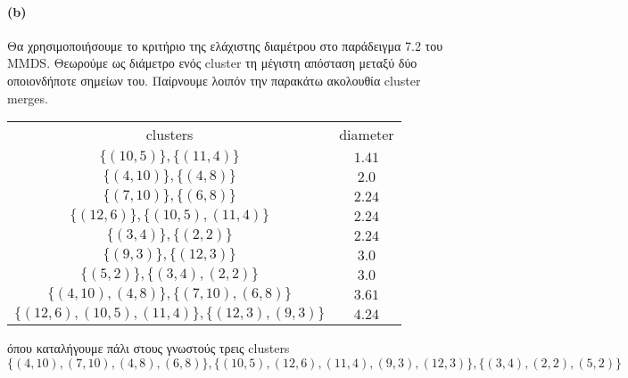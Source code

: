 \documentclass[a4paper,11pt]{article}
\begin{document}
\paragraph{(b)} Θα χρησιμοποιήσουμε το κριτήριο της ελάχιστης διαμέτρου στο παράδειγμα 7.2 του MMDS.
Θεωρούμε ως διάμετρο ενός cluster τη μέγιστη απόσταση μεταξύ δύο οποιονδήποτε σημείων του.
Παίρνουμε λοιπόν την παρακάτω ακολουθία cluster merges.
\begin{center}
	\begin{tabular}{| c | c |}
		\hline
		clusters & diameter \\ \hhline{|=|=|}
		$\{(10, 5)\},\{(11, 4)\}$ & $1.41$ \\ \hline
		$\{(4, 10)\},\{(4, 8)\}$ & $2.0$ \\ \hline
		$\{(7, 10)\},\{(6, 8)\}$ & $2.24$ \\ \hline
		$\{(12, 6)\},\{(10, 5), (11, 4)\}$ & $2.24$ \\ \hline
		$\{(3, 4)\},\{(2, 2)\}$ & $2.24$ \\ \hline
		$\{(9, 3)\},\{(12, 3)\}$ & $3.0$ \\ \hline
		$\{(5, 2)\},\{(3, 4), (2, 2)\}$ & $3.0$ \\ \hline
		$\{(4, 10), (4, 8)\},\{(7, 10), (6, 8)\}$ & $3.61$ \\ \hline
		$\{(12, 6), (10, 5), (11, 4)\},\{(12, 3), (9, 3)\}$ & $4.24$ \\ \hline
	\end{tabular}
\end{center}
όπου καταλήγουμε πάλι στους γνωστούς τρεις clusters
\[ \{ (4,10),(7,10),(4,8),(6,8) \}, \{ (10,5),(12,6),(11,4),(9,3),(12,3) \}, \{ (3,4),(2,2),(5,2) \} \]


\end{document}
